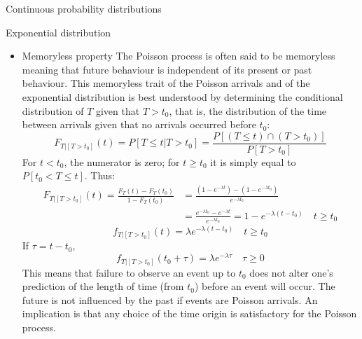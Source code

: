 \documentclass[8pt]{beamer}
\renewcommand{\emph}[1]{\textcolor{myorange}{#1}}
\begin{document}
\begin{frame}{Continuous probability distributions}
    \begin{block}{\alert{Exponential} distribution}
        \begin{itemize}
            \item \emph{Memoryless property}
                The \emph{Poisson process} is often said to be \emph{memoryless} meaning that  future behaviour is independent of its present or past behaviour. This memoryless trait of the Poisson arrivals and of the exponential distribution is best understood by determining the conditional distribution of $T$ given that $T > t_0$, that is, the distribution of the time between arrivals given that no arrivals occurred before $t_0$:
                \vspace{-10pt}
                \[
                    F_{T|[T > t_0 ]} (t) = P[T \leq t | T > t_0] = \frac{P\left[(T \leq t) \cap (T > t_0) \right]}{P[T > t_0]}
                \]
                For $t < t_0$, the numerator is zero; for $t \geq t_0$ it is simply equal to $P[t_0 < T \leq t]$. Thus:
                \vspace{-5pt}
         \begin{align*}
             \displaystyle
             F_{T|[T > t_0 ]} (t) = \frac{F_T (t) - F_T (t_0)}{1- F_T (t_0)} &= \frac{(1-e^{-\lambda t}) - (1-e^{-\lambda t_0})}{e^{-\lambda t_0}} \\
                                                                             &= \frac{e^{-\lambda t_0}-e^{-\lambda t}}{e^{-\lambda t_0}} = 1-e^{-\lambda(t-t_0)} \quad t \geq t_0
         \end{align*}
         \[
             f_{T|[T> t_0]} (t) = \lambda e^{-\lambda (t-t_0)} \quad t \geq t_0
         \]
         If $\tau = t - t_0$, 
                \vspace{-5pt}
         \[
             f_{T|[T> t_0]} (t_0 + \tau) = \lambda e^{-\lambda \tau} \quad \tau \geq 0
         \]
          This means that failure to observe an event up to $t_0$ does not alter one's prediction of the length of time (from $t_0$) before an event will occur. The future is not influenced by the past if events are \emph{Poisson arrivals}. An implication is that any choice of the time origin is satisfactory for the \emph{Poisson process}.

        \end{itemize}
        
    \end{block}
\end{frame}
\end{document}
